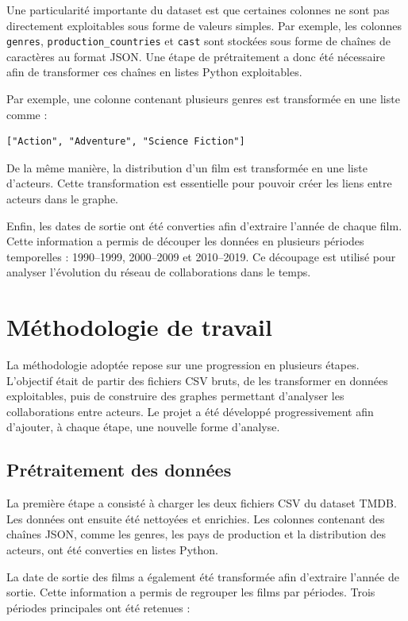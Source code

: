 \documentclass[11pt,a4paper,oneside,openany]{report}
\begin{document}
Une particularité importante du dataset est que certaines colonnes ne sont pas directement exploitables sous forme de valeurs simples. Par exemple, les colonnes \texttt{genres}, \texttt{production\_countries} et \texttt{cast} sont stockées sous forme de chaînes de caractères au format JSON. Une étape de prétraitement a donc été nécessaire afin de transformer ces chaînes en listes Python exploitables.

Par exemple, une colonne contenant plusieurs genres est transformée en une liste comme :

\begin{verbatim}
["Action", "Adventure", "Science Fiction"]
\end{verbatim}

De la même manière, la distribution d’un film est transformée en une liste d’acteurs. Cette transformation est essentielle pour pouvoir créer les liens entre acteurs dans le graphe.

Enfin, les dates de sortie ont été converties afin d’extraire l’année de chaque film. Cette information a permis de découper les données en plusieurs périodes temporelles : 1990--1999, 2000--2009 et 2010--2019. Ce découpage est utilisé pour analyser l’évolution du réseau de collaborations dans le temps.

\chapter{Méthodologie de travail}

La méthodologie adoptée repose sur une progression en plusieurs étapes. L’objectif était de partir des fichiers CSV bruts, de les transformer en données exploitables, puis de construire des graphes permettant d’analyser les collaborations entre acteurs. Le projet a été développé progressivement afin d’ajouter, à chaque étape, une nouvelle forme d’analyse.

\section{Prétraitement des données}

La première étape a consisté à charger les deux fichiers CSV du dataset TMDB. Les données ont ensuite été nettoyées et enrichies. Les colonnes contenant des chaînes JSON, comme les genres, les pays de production et la distribution des acteurs, ont été converties en listes Python.

La date de sortie des films a également été transformée afin d’extraire l’année de sortie. Cette information a permis de regrouper les films par périodes. Trois périodes principales ont été retenues :
\end{document}

